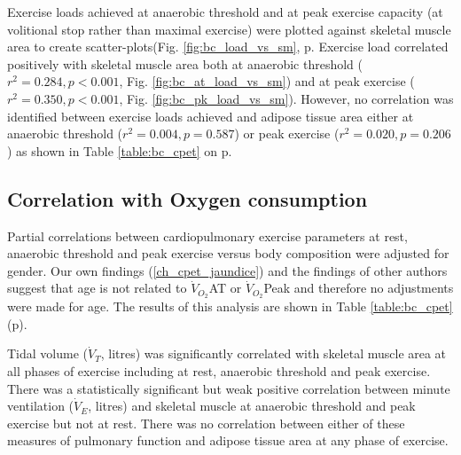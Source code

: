 Exercise loads achieved at anaerobic threshold and at peak exercise capacity (at volitional stop rather than maximal exercise) were plotted against skeletal muscle area to create scatter-plots(Fig. \ref{fig:bc_load_vs_sm}, p\pageref{fig:bc_load_vs_sm}. Exercise load correlated positively with skeletal muscle area both at anaerobic threshold ($r^{2} = 0.284, p < 0.001$, Fig. \ref{fig:bc_at_load_vs_sm}) and at peak exercise ($r^{2} = 0.350, p < 0.001$, Fig. \ref{fig:bc_pk_load_vs_sm}). However, no correlation was identified between exercise loads achieved and adipose tissue area either at anaerobic threshold ($r^{2} = 0.004, p = 0.587$) or peak exercise ($r^{2} = 0.020, p = 0.206$) as shown in Table \ref{table:bc_cpet} on p\pageref{table:bc_cpet}. 


\subsection{Correlation with Oxygen consumption}



Partial correlations between cardiopulmonary exercise parameters at rest, anaerobic threshold and peak exercise versus body composition were adjusted for gender. Our own findings (\ref{ch_cpet_jaundice}) and the findings of other authors suggest that age is not related to $\dot{V}_{O_2}$AT or $\dot{V}_{O_2}$Peak and therefore no adjustments were made for age. The results of this analysis are shown in Table \ref{table:bc_cpet} (p\pageref{table:bc_cpet}).

Tidal volume ($\dot{V}_T$, litres) was significantly correlated with skeletal muscle area at all phases of exercise including at rest, anaerobic threshold and peak exercise. There was a statistically significant but weak positive correlation between minute ventilation ($\dot{V}_E$, litres) and skeletal muscle at anaerobic threshold and peak exercise but not at rest. There was no correlation between either of these measures of pulmonary function and adipose tissue area at any phase of exercise.

